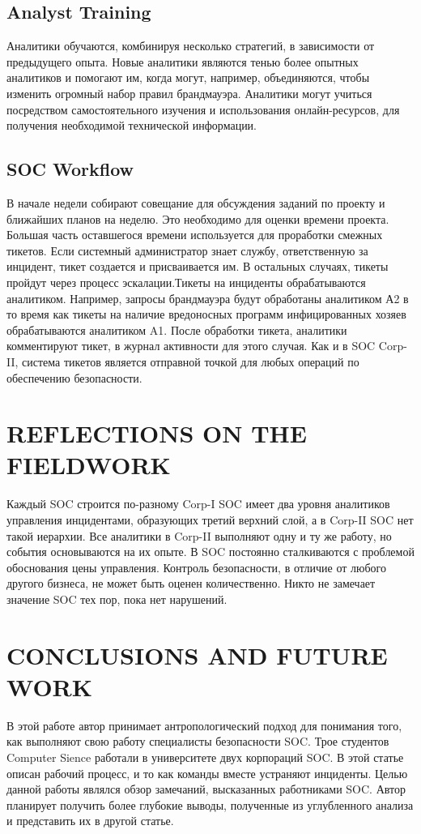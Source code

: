 \documentclass[12pt,]{article}
\begin{document}
\subsection{Analyst Training}
Аналитики обучаются, комбинируя несколько стратегий, в зависимости от предыдущего опыта. Новые аналитики являются тенью более опытных аналитиков и помогают им, когда могут, например, объединяются, чтобы изменить огромный набор правил брандмауэра. Аналитики могут учиться посредством самостоятельного изучения и использования онлайн-ресурсов, для получения необходимой технической информации.
\subsection{SOC Workflow}
В начале недели собирают совещание для обсуждения заданий по проекту и ближайших планов на неделю. Это необходимо для оценки времени проекта. Большая часть оставшегося времени используется для проработки смежных тикетов. Если системный администратор знает службу, ответственную за инцидент, тикет создается и присваивается им. В остальных случаях, тикеты пройдут через процесс эскалации.Тикеты на инциденты обрабатываются аналитиком. Например, запросы брандмауэра будут обработаны аналитиком А2 в то время как тикеты на наличие вредоносных программ инфицированных хозяев обрабатываются аналитиком A1. После обработки тикета, аналитики комментируют тикет, в  журнал активности для этого случая. Как и в SOC Corp-II, система тикетов является отправной точкой для любых операций по обеспечению безопасности.
\section{REFLECTIONS ON THE FIELDWORK}
Каждый SOC строится по-разному Corp-I SOC имеет два уровня аналитиков управления инцидентами, образующих третий верхний слой, а в Corp-II SOC нет такой иерархии. Все аналитики в Corp-II выполняют одну и ту же работу, но события основываются на их опыте.
В SOC постоянно сталкиваются с проблемой обоснования цены управления. Контроль безопасности, в отличие от любого другого бизнеса, не может быть оценен количественно. Никто не замечает значение SOC тех пор, пока нет нарушений.
\section{CONCLUSIONS AND FUTURE WORK}
В этой работе автор принимает антропологический подход для понимания того, как выполняют свою работу специалисты безопасности SOC. Трое студентов Computer Sience работали в университете двух корпораций SOC. В этой статье описан рабочий процесс, и то как команды вместе устраняют инциденты.
Целью данной работы являлся обзор замечаний, высказанных работниками SOC.
Автор планирует получить более глубокие выводы, полученные из углубленного анализа и представить их в другой статье.
\end{document}
